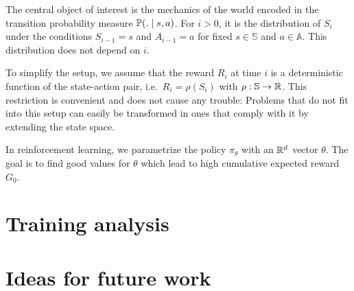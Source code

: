\documentclass[a4paper,12pt]{amsart}
\newcommand{\stateSpace}{\mathbb S}
\newcommand{\actionSpace}{\mathbb A}
\newcommand{\policy}{\pi}
\newcommand{\prob}{\mathbb P}
\begin{document}
The central object of interest is the mechanics of the world encoded in the
transition probability measure $\prob(. \vb s, a)$. For $i>0$, it is the distribution of
$S_i$ under the conditions $S_{i-1} = s$ and $A_{i-1} = a$ for fixed
$s\in\stateSpace$ and $a\in\actionSpace$. This distribution does not depend on $i$. 

To simplify the setup, we assume that the reward $R_i$ at time $i$ is a deterministic
function of the state-action pair, i.e.\ $R_i = \rho(S_i)$ with $\rho: \stateSpace\to\R$.
This restriction is convenient and does not cause any trouble: 
Problems that do not fit into this setup can easily be transformed in ones
that comply with it by extending the state space. 

In reinforcement learning, we parametrize the policy $\policy_\theta$ with
an $\mathbb{R}^{d}$ vector $\theta$. The goal is to find good values for $\theta$ 
which lead to high cumulative expected reward $G_{0}$.




\section{Training analysis}

\section{Ideas for future work}

\printbibliography
\end{document}
